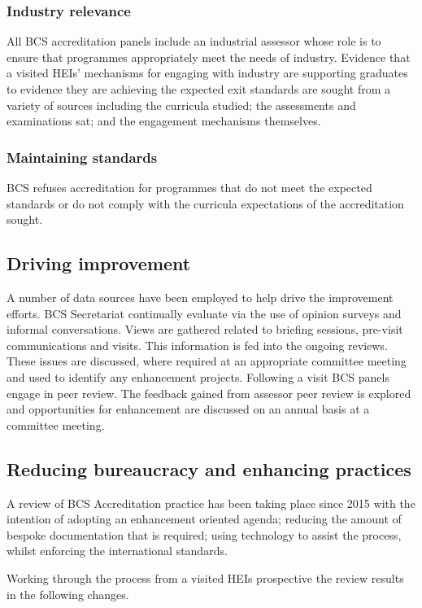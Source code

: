 \documentclass[sigconf]{acmart}
\begin{document}
\subsubsection{Industry relevance}
All BCS accreditation panels include an industrial assessor whose role is to ensure that programmes appropriately meet the needs of industry. Evidence that a visited HEIs' mechanisms for engaging with industry are supporting graduates to evidence they are achieving the expected exit standards are sought from a variety of sources including the curricula studied; the assessments and examinations sat; and the engagement mechanisms themselves.

\subsubsection{Maintaining standards}
BCS refuses accreditation for programmes that do not meet the expected standards or do not comply with the curricula expectations of the accreditation sought.

\subsection{Driving improvement}
A number of data sources have been employed to help drive the improvement efforts. BCS Secretariat continually evaluate via the use of opinion surveys and informal conversations. Views are gathered related to briefing sessions, pre-visit communications and visits. This information is fed into the ongoing reviews. These issues are discussed, where required at an appropriate committee meeting and used to identify any enhancement projects. Following a visit BCS panels engage in peer review. The feedback gained from assessor peer review is explored and opportunities for enhancement are discussed on an annual basis at a committee meeting. 

\subsection{Reducing bureaucracy and enhancing practices}
A review of BCS Accreditation practice has been taking place since 2015 with the intention of adopting an enhancement oriented agenda; reducing the amount of bespoke documentation that is required; using technology to assist the process, whilst enforcing the international standards.

Working through the process from a visited HEIs prospective the review results in the following changes.
\end{document}
